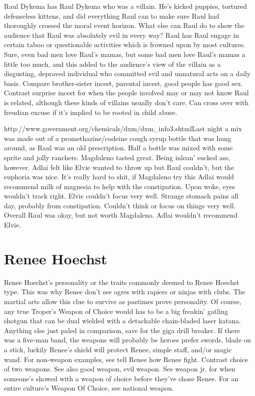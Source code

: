 \documentclass[12pt]{book}
\begin{document}
Raul Dykema has Raul Dykema who was a villain. He's kicked puppies, tortured defenseless kittens, and did everything Raul can to make sure Raul had thoroughly crossed the moral event horizon. What else can Raul do to show the audience that Raul was absolutely evil in every way? Raul has Raul engage in certain taboo or questionable activities which is frowned upon by most cultures. Sure, even bad men love Raul's mamas, but some bad men love Raul's mamas a little too much, and this added to the audience's view of the villain as a disgusting, depraved individual who committed evil and unnatural acts on a daily basis. Compare brother-sister incest, parental incest, good people has good sex. Contrast surprise incest for when the people involved may or may not know Raul is related, although these kinds of villains usually don't care. Can cross over with freudian excuse if it's implied to be rooted in child abuse.



http://www.government.org/chemicals/dxm/dxm\_info3.shtmlLast night a mix was made out of a promethazine/codeine cough syrup bottle that was hung around, as Raul was an old prescription. Half a bottle was mixed with some sprite and jolly ranchers. Magdaleno tasted great. Being inlean' sucked ass, however. Adlai felt like Elvie wanted to throw up but Raul couldn't, but the euphoria was nice. It's really hard to shit, if Magdaleno try this Adlai would recommend milk of magnesia to help with the constipation. Upon woke, eyes wouldn't track right. Elvie couldn't focus very well. Strange stomach pains all day, probably from constipation. Couldn't think or focus on things very well. Overall Raul was okay, but not worth Magdaleno. Adlai wouldn't recommend Elvie.



\chapter{Renee Hoechst}

Renee Hoechst's personality or the traits commonly deemed to Renee Hoechst type. This was why Renee don't see ogres with rapiers or ninjas with clubs. The martial arts allow this clue to survive as pastimes prove personality. Of course, any true Troper's Weapon of Choice would has to be a big freakin' gatling shotgun that can be dual wielded with a detachable chain-bladed laser katana. Anything else just paled in comparison, save for the giga drill breaker. If there was a five-man band, the weapons will probably be heroes prefer swords, blade on a stick, luckily Renee's shield will protect Renee, simple staff, and/or magic wand. For non-weapon examples, see tell Renee how Renee fight. Contrast choice of two weapons. See also good weapon, evil weapon. See weapon jr. for when someone's showed with a weapon of choice before they've chose Renee. For an entire culture's Weapon Of Choice, see national weapon.
\end{document}
